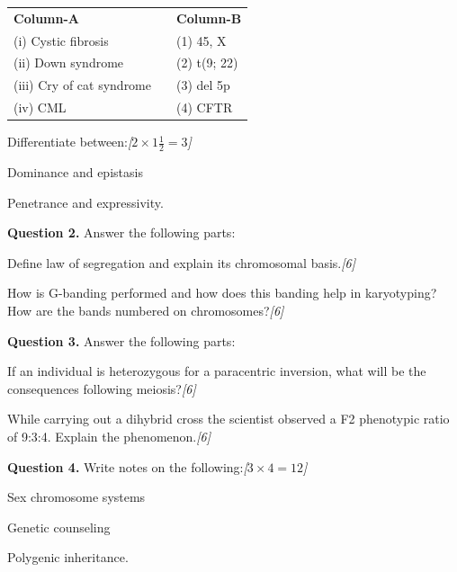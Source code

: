 \documentclass[11pt,a4paper]{article}
\newcommand{\pts}[1]{\hfill   \textit{[#1]}}
\begin{document}
\begin{parts}
\begin{center}
\begin{tabular}{lp{1cm}l}
   \textbf{Column-A} & &   \textbf{Column-B} \\
      (i) Cystic fibrosis & & (1) 45, X \\
      (ii) Down syndrome & & (2) t(9; 22) \\
      (iii) Cry of cat syndrome & & (3) del 5p \\
      (iv) CML & & (4) CFTR \\
    \end{tabular}
  \end{center}

  \item Differentiate between:\pts{$2  \times 1\frac{1}{2} = 3$}
  
\begin{parts}
    \item Dominance and epistasis
    \item Penetrance and expressivity.
  \end{parts}
\end{parts}

\medskip


\noindent   \textbf{Question 2.} Answer the following parts:

\begin{parts}
  \item Define law of segregation and explain its chromosomal basis.\pts{6}
  \item How is G-banding performed and how does this banding help in karyotyping? How are the bands numbered on chromosomes?\pts{6}
\end{parts}

\medskip


\noindent   \textbf{Question 3.} Answer the following parts:

\begin{parts}
  \item If an individual is heterozygous for a paracentric inversion, what will be the consequences following meiosis?\pts{6}
  \item While carrying out a dihybrid cross the scientist observed a F2 phenotypic ratio of 9:3:4. Explain the phenomenon.\pts{6}
\end{parts}

\medskip


\noindent   \textbf{Question 4.} Write notes on the following:\pts{$3  \times 4 = 12$}

\begin{parts}
  \item Sex chromosome systems
  \item Genetic counseling
  \item Polygenic inheritance.
\end{parts}
\end{document}
